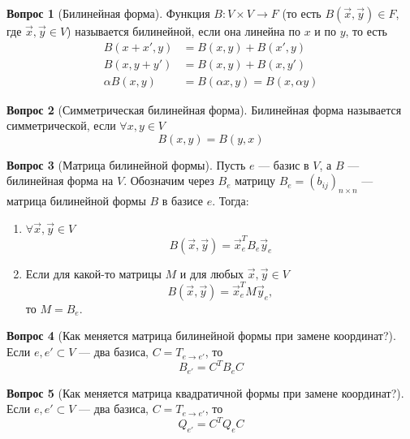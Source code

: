 \documentclass[a4paper,11pt]{article}
\theoremstyle{remark}
\theoremstyle{definition}
\newtheorem{question}{Вопрос}
\begin{document}
\begin{question}[Билинейная форма]
Функция \(B: V \times V \rightarrow F\) (то есть \(B(\vec{x}, \vec{y}) \in F\), где \(\vec{x}, \vec{y} \in V\)) называется билинейной, если она линейна по \(x\) и по \(y\), то есть
\begin{align*}
	B(x + x', y) &= B(x, y) + B(x', y) \\
	B(x, y + y') &= B(x, y) + B(x, y') \\
	\alpha{}B(x, y) &= B(\alpha{}x, y) = B(x, \alpha{}y)
\end{align*}
\end{question}


\begin{question}[Симметрическая билинейная форма]
Билинейная форма называется симметрической, если \(\forall x,y \in V\)
\begin{equation*}
	B(x, y) = B(y, x)
\end{equation*}
\end{question}


\begin{question}[Матрица билинейной формы]
Пусть \(e\) --- базис в \(V\), а \(B\) --- билинейная форма на \(V\). Обозначим через \(B_e\) матрицу \(B_e = (b_{ij})_{n \times n}\) --- матрица билинейной формы \(B\) в базисе \(e\). Тогда:
\begin{enumerate}
	\item \(\forall \vec{x}, \vec{y} \in V\)
	\begin{equation*}
		B(\vec{x}, \vec{y}) = \vec{x}_e^T B_e \vec{y}_e
	\end{equation*}
	\item Если для какой-то матрицы \(M\) и для любых \(\vec{x}, \vec{y} \in V\) 
	\begin{equation*}
		B(\vec{x}, \vec{y}) = \vec{x}_e^T M \vec{y}_e,
	\end{equation*}
	то \(M = B_e\).
\end{enumerate}
\end{question}


\begin{question}[Как меняется матрица билинейной формы при замене координат?]
Если \(e, e' \subset V\) --- два базиса, \(C = T_{e \rightarrow e'}\), то 
\begin{equation*}
	B_{e'} = C^T B_e C
\end{equation*}
\end{question}


\begin{question}[Как меняется матрица квадратичной формы при замене координат?]
Если \(e, e' \subset V\) --- два базиса, \(C = T_{e \rightarrow e'}\), то 
\begin{equation*}
	Q_{e'} = C^T Q_e C
\end{equation*}
\end{question}
\end{document}
